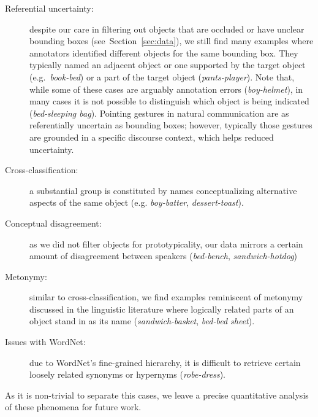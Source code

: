 \begin{description}
\item[Referential uncertainty:] despite our care in filtering out objects that are occluded or have unclear bounding boxes (see\ Section~\ref{sec:data}), we still find many examples where annotators identified different objects for the same bounding box. They typically named an adjacent object or one supported by the target object (e.g.\ \textit{book-bed}) or a part of the target object (\textit{pants-player}).
Note that, while some of these cases are arguably annotation errors (\textit{boy-helmet}), in many cases it is not possible to distinguish which object is being indicated (\textit{bed-sleeping bag}). Pointing gestures in natural communication are as referentially uncertain as bounding boxes; however, typically those gestures are grounded in a specific discourse context, which helps reduced uncertainty.
\item[Cross-classification:] a substantial group is constituted by names conceptualizing alternative aspects of the same object (e.g. \textit{boy-batter}, \textit{dessert-toast}).
\item[Conceptual disagreement:] as we did not filter objects for prototypicality, our data mirrors a certain amount of disagreement between speakers (\textit{bed-bench}, \textit{sandwich-hotdog})
\item[Metonymy:] similar to cross-classification, we find examples reminiscent of metonymy discussed in the linguistic literature \cite{pustejovsky1991generative} where logically related parts of an object stand in as its name (\textit{sandwich-basket}, \textit{bed-bed sheet}). 
\item[Issues with WordNet:] due to WordNet's fine-grained hierarchy, it is difficult to retrieve certain loosely related synonyms or hypernyms (\textit{robe-dress}).
\end{description}

As it is non-trivial to separate this cases, we leave a precise quantitative analysis of these phenomena for future work.

